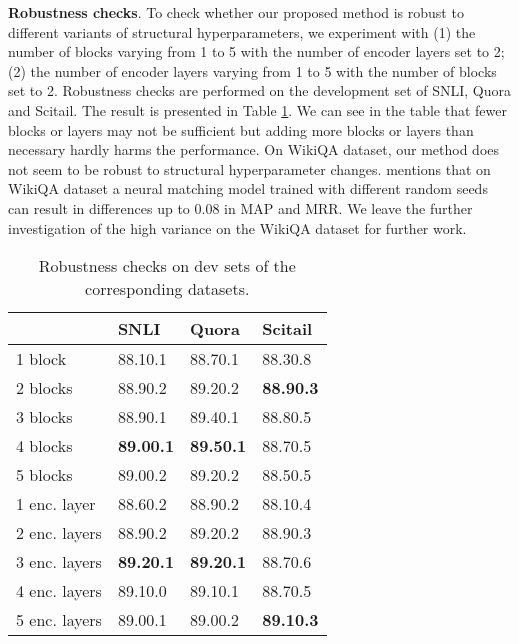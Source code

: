 \documentclass[11pt,a4paper]{article}
\begin{document}
{\bf Robustness checks}. To check whether our proposed method is robust to different variants of structural hyperparameters, we experiment with (1) the number of blocks varying from 1 to 5 with the number of encoder layers set to 2; (2) the number of encoder layers varying from 1 to 5 with the number of blocks set to 2. Robustness checks are performed on the development set of SNLI, Quora and Scitail. The result is presented in Table \ref{tab:robustness}. We can see in the table that fewer blocks or layers may not be sufficient but adding more blocks or layers than necessary hardly harms the performance. 
On WikiQA dataset, our method does not seem to be robust to structural hyperparameter changes. \citeauthor{crane2018questionable}  mentions that on WikiQA dataset a neural matching model \cite{severyn2015learning} trained with different random seeds can result in differences up to 0.08 in MAP and MRR. We leave the further investigation of the high variance on the WikiQA dataset for further work.

\begin{table}
  \centering
  \small
  \begin{tabular}{|l|l|l|l|}
  \hline
    & {\bf SNLI} & {\bf Quora} & {\bf Scitail} \\\hline
  1 block & 88.10.1       & 88.70.1       & 88.30.8        \\
  2 blocks & 88.90.2       & 89.20.2       & {\bf 88.90.3}  \\
  3 blocks & 88.90.1       & 89.40.1       & 88.80.5        \\
  4 blocks & {\bf 89.00.1} & {\bf 89.50.1} & 88.70.5        \\
  5 blocks & 89.00.2       & 89.20.2       & 88.50.5        \\\hline
  1 enc. layer & 88.60.2       & 88.90.2       & 88.10.4       \\
  2 enc. layers & 88.90.2       & 89.20.2       & 88.90.3       \\
  3 enc. layers & {\bf 89.20.1} & {\bf 89.20.1} & 88.70.6       \\
  4 enc. layers & 89.10.0       & 89.10.1       & 88.70.5       \\
  5 enc. layers & 89.00.1       & 89.00.2       & {\bf 89.10.3} \\\hline
  \end{tabular}
  \caption{Robustness checks on dev sets of the corresponding datasets.}
  \label{tab:robustness}
\end{table}
\end{document}
